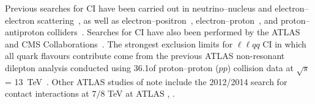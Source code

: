 Previous searches for CI have been carried out in neutrino--nucleus and electron--electron scattering~\cite{Anthony:2005pm}, as well as electron--positron~\cite{Abdallah:2008ab, Schael:2006wu}, electron--proton~\cite{Aaron:2011mv}, and proton--antiproton colliders~\cite{Abulencia:2006iv,Abazov:2009ac}.
Searches for CI have also been performed by the ATLAS and CMS Collaborations~\cite{Aad:2014wca, Khachatryan:2014fba}.
The strongest exclusion limits for $\ell\ell q q$ CI in which all quark flavours contribute come from the previous ATLAS non-resonant dilepton analysis conducted using 36.1\fb of proton--proton ($pp$) collision data at $\sqrt{s}$ = 13~TeV~\cite{Aaboud:2016cth}.
Other ATLAS studies of note include the 2012/2014 search for contact interactions at $7/8$ TeV at ATLAS \cite{EXOT-2013-19}, \cite{EXOT-2012-17}.

